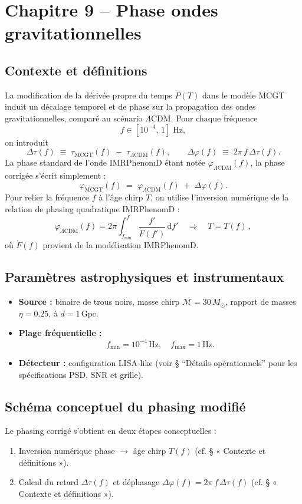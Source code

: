 \section{Chapitre 9 – Phase ondes gravitationnelles }

\subsection{Contexte et définitions}
La modification de la dérivée propre du temps \(\dot P(T)\) dans le modèle MCGT induit un décalage temporel et de phase sur la propagation des ondes gravitationnelles, comparé au scénario \(\Lambda\)CDM. Pour chaque fréquence
\[
  f \in [10^{-4},\,1]\;\mathrm{Hz},
\]
on introduit
\[
  \Delta\tau(f)
  \;\equiv\;
  \tau_{\mathrm{MCGT}}(f)\;-\;\tau_{\Lambda\mathrm{CDM}}(f),
  \qquad
  \Delta\varphi(f)
  \;\equiv\;
  2\pi\,f\,\Delta\tau(f).
\]
La phase standard de l’onde IMRPhenomD étant notée \(\varphi_{\Lambda\mathrm{CDM}}(f)\), la phase corrigée s’écrit simplement :
\[
  \varphi_{\mathrm{MCGT}}(f)
  \;=\;
  \varphi_{\Lambda\mathrm{CDM}}(f)
  \;+\;\Delta\varphi(f).
\]
Pour relier la fréquence \(f\) à l’âge chirp \(T\), on utilise l’inversion numérique de la relation de phasing quadratique IMRPhenomD :
\[
  \varphi_{\Lambda\mathrm{CDM}}(f)
  = 2\pi \int_{f_{\min}}^{f}
    \frac{f'}{\dot F(f')}\,\mathrm{d}f'
  \quad\Longrightarrow\quad
  T = T(f)\,,
\]
où \(\dot F(f)\) provient de la modélisation IMRPhenomD.

\subsection{Paramètres astrophysiques et instrumentaux}
\begin{itemize}
  \item \textbf{Source :} binaire de trous noirs, masse chirp
        \(\mathcal{M}=30\,M_{\odot}\), rapport de masses \(\eta=0.25\), à
        \(d = 1\,\mathrm{Gpc}\).
  \item \textbf{Plage fréquentielle :}
        \[
          f_{\min} = 10^{-4}\,\mathrm{Hz},
          \quad
          f_{\max} = 1\,\mathrm{Hz}.
        \]
  \item \textbf{Détecteur :} configuration LISA-like (voir § “Détails opérationnels” pour les spécifications PSD, SNR et grille).
\end{itemize}

\subsection{Schéma conceptuel du phasing modifié}
Le phasing corrigé s’obtient en deux étapes conceptuelles :
\begin{enumerate}
  \item Inversion numérique phase \(\to\) âge chirp \(T(f)\)
        (cf. § « Contexte et définitions »).
  \item Calcul du retard \(\Delta\tau(f)\) et déphasage
        \(\Delta\varphi(f)=2\pi\,f\,\Delta\tau(f)\)
        (cf. § « Contexte et définitions »).
\end{enumerate}

